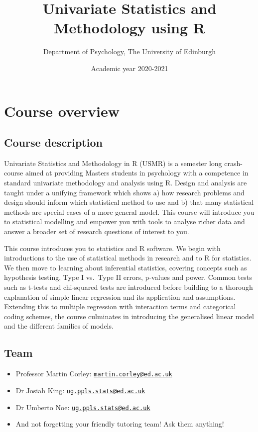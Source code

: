 \documentclass[]{book}
\title{ Univariate Statistics and Methodology using R}
\author{Department of Psychology, The University of Edinburgh}
\date{Academic year 2020-2021}
\providecommand{\tightlist}{%
  \setlength{\itemsep}{0pt}\setlength{\parskip}{0pt}}
\begin{document}
\maketitle

{
\setcounter{tocdepth}{1}
\tableofcontents
}
\hypertarget{chap-overview}{%
\chapter*{Course overview}\label{chap-overview}}

\hypertarget{course-description}{%
\section*{Course description}\label{course-description}}

Univariate Statistics and Methodology in R (USMR) is a semester long crash-course aimed at providing Masters students in psychology with a competence in standard univariate methodology and analysis using R. Design and analysis are taught under a unifying framework which shows a) how research problems and design should inform which statistical method to use and b) that many statistical methods are special cases of a more general model. This course will introduce you to statistical modelling and empower you with tools to analyse richer data and answer a broader set of research questions of interest to you.

This course introduces you to statistics and R software. We begin with introductions to the use of statistical methods in research and to R for statistics. We then move to learning about inferential statistics, covering concepts such as hypothesis testing, Type I vs.~Type II errors, p-values and power. Common tests such as t-tests and chi-squared tests are introduced before building to a thorough explanation of simple linear regression and its application and assumptions. Extending this to multiple regression with interaction terms and categorical coding schemes, the course culminates in introducing the generalised linear model and the different families of models.

\hypertarget{team}{%
\section*{Team}\label{team}}

\begin{itemize}
\tightlist
\item
  Professor Martin Corley: \href{mailto:martin.corley@ed.ac.uk}{\nolinkurl{martin.corley@ed.ac.uk}}
\item
  Dr Josiah King: \href{mailto:ug.ppls.stats@ed.ac.uk}{\nolinkurl{ug.ppls.stats@ed.ac.uk}}
\item
  Dr Umberto Noe: \href{mailto:ug.ppls.stats@ed.ac.uk}{\nolinkurl{ug.ppls.stats@ed.ac.uk}}
\item
  And not forgetting your friendly tutoring team! Ask them anything!
\end{itemize}
\end{document}
